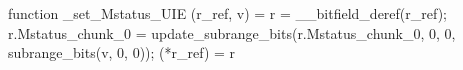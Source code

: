 function _set_Mstatus_UIE (r_ref, v) = {
    r = __bitfield_deref(r_ref);
    r.Mstatus_chunk_0 = update_subrange_bits(r.Mstatus_chunk_0, 0, 0, subrange_bits(v, 0, 0));
    (*r_ref) = r
}
